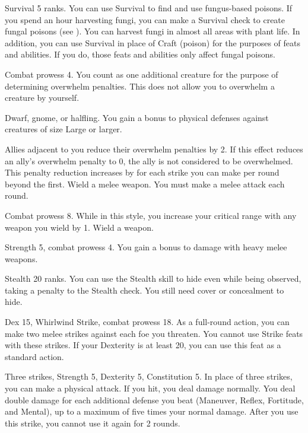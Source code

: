 \featpre Survival 5 ranks.
\featben You can use Survival to find and use fungus-based poisons.
If you spend an hour harvesting fungi, you can make a Survival check to create fungal poisons (see ).
You can harvest fungi in almost all areas with plant life.
In addition, you can use Survival in place of Craft (poison) for the purposes of feats and abilities.
If you do, those feats and abilities only affect fungal poisons.

\featpre Combat prowess 4.
\featben You count as one additional creature for the purpose of determining overwhelm penalties.
This does not allow you to overwhelm a creature by yourself.

\featpres Dwarf, gnome, or halfling.
\featben You gain a  bonus to physical defenses against creatures of size Large or larger.

\featben Allies adjacent to you reduce their overwhelm penalties by 2.
If this effect reduces an ally's overwhelm penalty to 0, the ally is not considered to be overwhelmed.
This penalty reduction increases by  for each strike you can make per round beyond the first.
\stylereq Wield a melee weapon.
You must make a melee attack each round.

\featpre Combat prowess 8.
\featben While in this style, you increase your critical range with any weapon you wield by 1.
\stylereq Wield a weapon.

\featpres Strength 5, combat prowess 4.
\featben You gain a  bonus to damage with heavy melee weapons.

\featpre Stealth 20 ranks.
\featben You can use the Stealth skill to hide even while being observed, taking a  penalty to the Stealth check.
You still need cover or concealment to hide.

\featpres Dex 15, Whirlwind Strike, combat prowess 18.
\featben As a full-round action, you can make two melee strikes against each foe you threaten. You cannot use Strike feats with these strikes.
If your Dexterity is at least 20, you can use this feat as a standard action.

\featpres Three strikes, Strength 5, Dexterity 5, Constitution 5.
\featben In place of three strikes, you can make a physical attack.
If you hit, you deal damage normally.
You deal double damage for each additional defense you beat (Maneuver, Reflex, Fortitude, and Mental), up to a maximum of five times your normal damage.
After you use this strike, you cannot use it again for 2 rounds.

